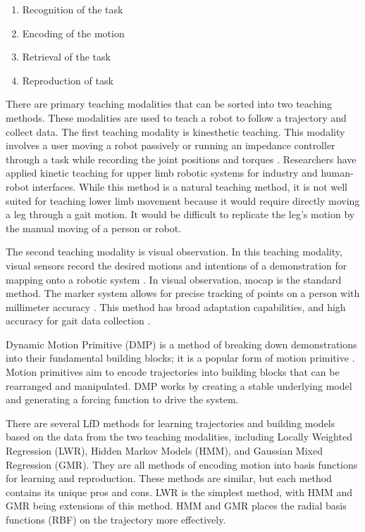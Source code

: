 \begin{enumerate}[noitemsep]
    \item Recognition of the task 
    \item Encoding of the motion 
    \item Retrieval of the task 
    \item Reproduction of task 
\end{enumerate} 

There are primary teaching modalities that can be sorted into two teaching methods. These modalities are used to teach a robot to follow a trajectory and collect data. The first teaching modality is kinesthetic teaching. This modality involves a user moving a robot passively or running an impedance controller through a task while recording the joint positions and torques \cite{Calinon2018}. Researchers have applied kinetic teaching for upper limb robotic systems for industry and human-robot interfaces. While this method is a natural teaching method, it is not well suited for teaching lower limb movement because it would require directly moving a leg through a gait motion. It would be difficult to replicate the leg's motion by the manual moving of a person or robot. 

The second teaching modality is visual observation. In this teaching modality, visual sensors record the desired motions and intentions of a demonstration for mapping onto a robotic system \cite{CalinonLee19}. In visual observation, mocap is the standard method. The marker system allows for precise tracking of points on a person with millimeter accuracy \cite{ott2008motion}. This method has broad adaptation capabilities, and high accuracy for gait data collection \cite{ViconGaiting}.

Dynamic Motion Primitive (DMP) is a method of breaking down demonstrations into their fundamental building blocks; it is a popular form of motion primitive \cite{ijspeert2013dynamical}. Motion primitives aim to encode trajectories into building blocks that can be rearranged and manipulated. DMP works by creating a stable underlying model and generating a forcing function to drive the system.  

There are several LfD methods for learning trajectories and building models based on the data from the two teaching modalities, including Locally Weighted Regression (LWR), Hidden Markov Models (HMM), and Gaussian Mixed Regression (GMR). They are all methods of encoding motion into basis functions for learning and reproduction. These methods are similar, but each method contains its unique pros and cons. LWR is the simplest method, with HMM and GMR being extensions of this method. HMM and GMR places the radial basis functions (RBF) on the trajectory more effectively.  

